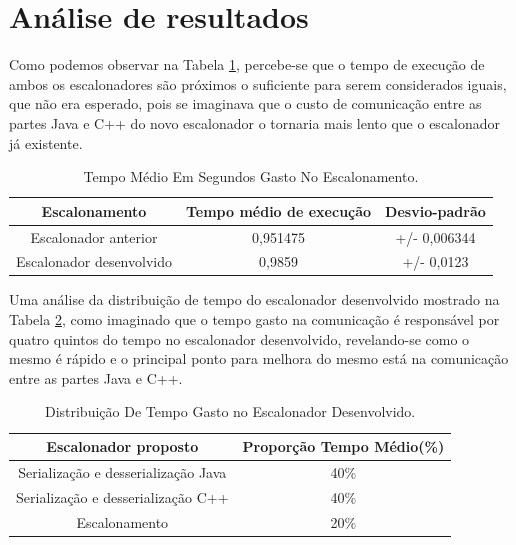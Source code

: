 \section{Análise de resultados}

Como podemos observar na Tabela \ref{TabelaTempoEscalonador}, percebe-se que o tempo de execução de ambos os escalonadores são próximos o suficiente para serem considerados iguais, que não era esperado, pois se imaginava que o custo de comunicação entre as partes Java e C++ do novo escalonador o tornaria mais lento que o escalonador já existente.


\begin {table}[H]
\begin{center}
	\begin{tabular}{ |c|c|c| } 
		\hline
		Escalonamento & Tempo médio de execução & Desvio-padrão \\ 
		\hline
		Escalonador anterior & 0,951475 & +/- 0,006344 \\ 
		\hline
		Escalonador desenvolvido & 0,9859 & +/- 0,0123 \\ 
		\hline
	\end{tabular}
\caption {Tempo Médio Em Segundos Gasto No Escalonamento.} \label{TabelaTempoEscalonador} 
\end{center}
\end {table}

Uma análise da distribuição de tempo do escalonador desenvolvido mostrado na Tabela \ref{TabelaProporcaoEscalonador}, como imaginado que o tempo gasto na comunicação é responsável por quatro quintos do tempo no escalonador desenvolvido, revelando-se como o mesmo é rápido e o principal ponto para melhora do mesmo está na comunicação entre as partes Java e C++.

\begin {table}[H]
\label{tabela8}
\begin{center}
	\begin{tabular}{ |c|c| } 
		\hline
		Escalonador proposto & Proporção Tempo Médio(\%) \\ 
		\hline
		Serialização e desserialização Java & 40\% \\ 
		\hline
		Serialização e desserialização C++ & 40\% \\ 
		\hline
		Escalonamento & 20\% \\ 
		\hline
	\end{tabular}
\caption {Distribuição De Tempo Gasto no Escalonador Desenvolvido.} \label{TabelaProporcaoEscalonador} 
\end{center}
\end {table}


